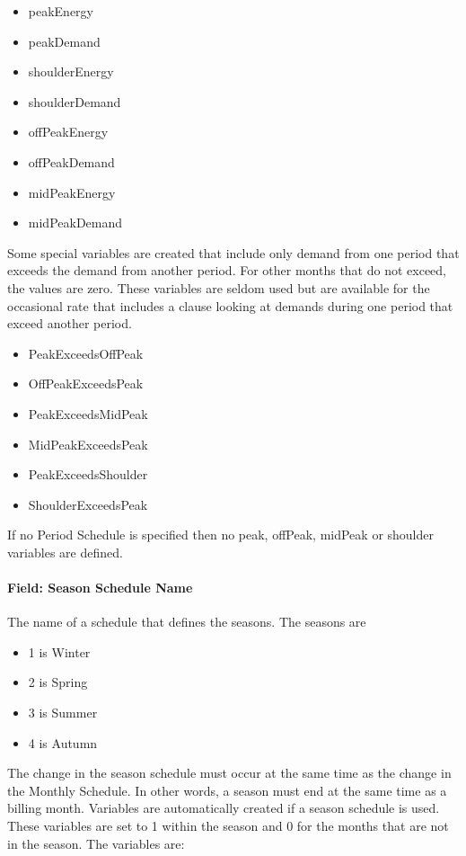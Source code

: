 \begin{itemize}
\item
  peakEnergy
\item
  peakDemand
\item
  shoulderEnergy
\item
  shoulderDemand
\item
  offPeakEnergy
\item
  offPeakDemand
\item
  midPeakEnergy
\item
  midPeakDemand
\end{itemize}

Some special variables are created that include only demand from one period that exceeds the demand from another period. For other months that do not exceed, the values are zero. These variables are seldom used but are available for the occasional rate that includes a clause looking at demands during one period that exceed another period.

\begin{itemize}
\item
  PeakExceedsOffPeak
\item
  OffPeakExceedsPeak
\item
  PeakExceedsMidPeak
\item
  MidPeakExceedsPeak
\item
  PeakExceedsShoulder
\item
  ShoulderExceedsPeak
\end{itemize}

If no Period Schedule is specified then no peak, offPeak, midPeak or shoulder variables are defined.

\paragraph{Field: Season Schedule Name}\label{field-season-schedule-name}

The name of a schedule that defines the seasons. The seasons are

\begin{itemize}
\item
  1 is Winter
\item
  2 is Spring
\item
  3 is Summer
\item
  4 is Autumn
\end{itemize}

The change in the season schedule must occur at the same time as the change in the Monthly Schedule. In other words, a season must end at the same time as a billing month. Variables are automatically created if a season schedule is used. These variables are set to 1 within the season and 0 for the months that are not in the season. The variables are:

